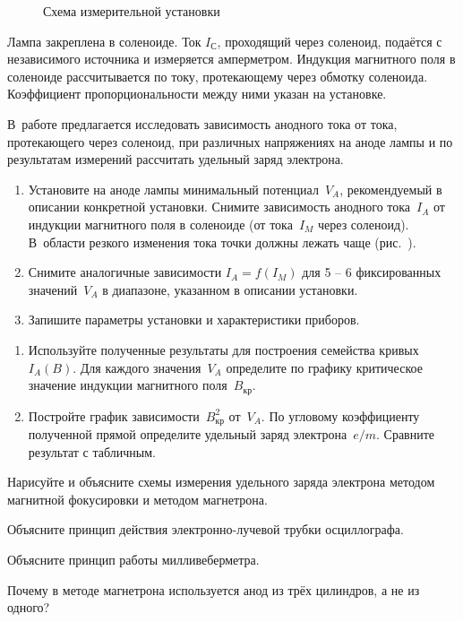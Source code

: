 \begin{figure}[h]
    \centering
	\caption{Схема измерительной установки}
\end{figure}

Лампа закреплена в соленоиде. Ток $I_{С}$, проходящий через соленоид, подаётся с
независимого источника и измеряется амперметром. Индукция магнитного поля в
соленоиде рассчитывается по току, протекающему через обмотку соленоида.
Коэффициент пропорциональности между ними указан на установке.

\begin{lab:task}

В~работе предлагается исследовать зависимость анодного тока от тока,
протекающего через соленоид, при различных
напряжениях на аноде лампы и по результатам измерений рассчитать удельный заряд
электрона.

\begin{enumerate}
\item{ Установите на аноде лампы минимальный потенциал~$V_A$, рекомендуемый в
описании конкретной установки. Снимите зависимость анодного тока~$I_A$ от
индукции магнитного поля в соленоиде (от тока~$I_{M}$ через соленоид). В~области
резкого изменения тока точки должны лежать чаще (рис.~)}.
\item{ Снимите аналогичные зависимости $I_A=f(I_M)$ для 5 -- 6 фиксированных
значений~$V_A$ в диапазоне, указанном в описании установки.}

\item{ Запишите параметры установки и характеристики приборов.}
\end{enumerate}

\begin{enumerate}
\item{Используйте полученные результаты для построения семейства кривых
$I_{A}(B)$. Для каждого значения~$V_A$ определите по графику критическое
значение индукции магнитного поля~$B_\text{кр}$}.
\item Постройте  график зависимости~$B_\text{кр}^2$ от~$V_A$. По угловому
коэффициенту полученной прямой определите удельный заряд электрона~$e/m$.
Сравните результат с табличным.
\end{enumerate}
\end{lab:task}

\begin{lab:questions}
\item{ Нарисуйте и объясните схемы измерения удельного заряда электрона методом
магнитной фокусировки и методом магнетрона.}
\item{Объясните принцип действия электронно-лучевой трубки осциллографа.}
\item{ Объясните принцип работы милливеберметра.}
\item{ Почему в методе магнетрона используется анод из трёх цилиндров, а не из
одного?}
\end{lab:questions}

